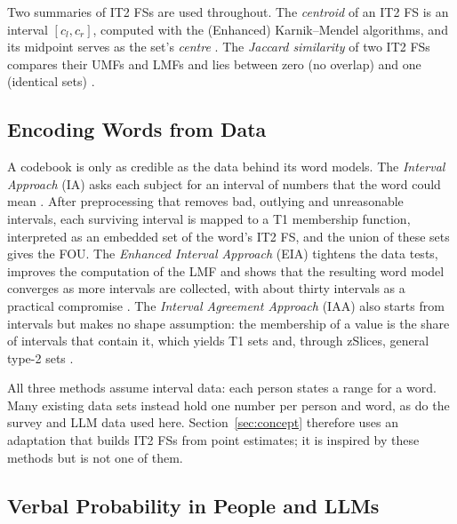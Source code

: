 Two summaries of IT2 FSs are used throughout.
The \emph{centroid} of an IT2 FS is an interval $[c_l, c_r]$, computed with the (Enhanced) Karnik--Mendel algorithms,
and its midpoint serves as the set's \emph{centre} \citep{karnik2001centroid,wu2009ekm}.
The \emph{Jaccard similarity} of two IT2 FSs compares their UMFs and LMFs and lies between zero (no overlap) and one
(identical sets) \citep{wu2009comparative}.

\subsection{Encoding Words from Data}
\label{sec:bg-encoding}

A codebook is only as credible as the data behind its word models.
The \emph{Interval Approach} (IA) asks each subject for an interval of numbers that the word could mean
\citep{liu2008ia}.
After preprocessing that removes bad, outlying and unreasonable intervals, each surviving interval is mapped to a T1
membership function, interpreted as an embedded set of the word's IT2 FS, and the union of these sets gives the FOU.
The \emph{Enhanced Interval Approach} (EIA) tightens the data tests, improves the computation of the LMF and shows that
the resulting word model converges as more intervals are collected, with about thirty intervals as a practical
compromise \citep{wu2012eia}.
The \emph{Interval Agreement Approach} (IAA) also starts from intervals but makes no shape assumption: the membership
of a value is the share of intervals that contain it, which yields T1 sets and, through zSlices, general type-2 sets
\citep{wagner2015iaa}.

All three methods assume interval data: each person states a range for a word.
Many existing data sets instead hold one number per person and word, as do the survey and LLM data used here.
Section~\ref{sec:concept} therefore uses an adaptation that builds IT2 FSs from point estimates; it is inspired by
these methods but is not one of them.

\subsection{Verbal Probability in People and LLMs}
\label{sec:bg-verbal}

